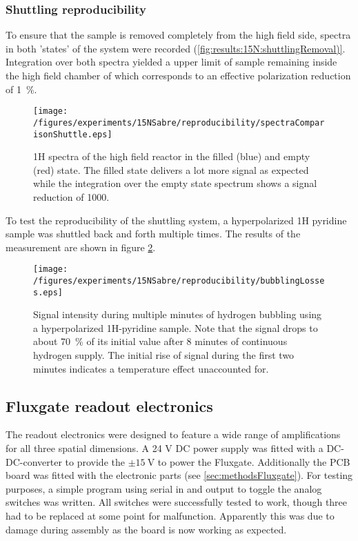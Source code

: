         \subsubsection{Shuttling reproducibility}
        To ensure that the sample is removed completely from the high field side, spectra in both 'states' of the system were recorded (\ref{fig:results:15N:shuttlingRemoval)}. Integration over both spectra yielded a upper limit of sample remaining inside the high field chamber of which corresponds to an effective polarization reduction of \SI{1}{\percent}.
        \begin{figure}
            \label{fig:results:15N:shuttlingRemoval}
            \centering
            \texttt{[image: /figures/experiments/15NSabre/reproducibility/spectraComparisonShuttle.eps]}
            \caption[High field removal efficiency]{1H spectra of the high field reactor in the filled (blue) and empty (red) state. The filled state delivers a lot more signal as expected while the integration over the empty state spectrum shows a signal reduction of 1000.}
        \end{figure}
        To test the reproducibility of the shuttling system, a hyperpolarized 1H pyridine sample was shuttled back and forth multiple times. The results of the measurement are shown in figure \ref{fig:results:15N:shuttlingReproducibility}. 
        \begin{figure}
            \label{fig:results:15N:shuttlingReproducibility}
            \centering
            \texttt{[image: /figures/experiments/15NSabre/reproducibility/bubblingLosses.eps]}
            \caption[Bubbling fluid losses]{Signal intensity during multiple minutes of hydrogen bubbling using a hyperpolarized 1H-pyridine sample. Note that the signal drops to about \SI{70}{\percent} of its initial value after 8 minutes of continuous hydrogen supply. The initial rise of signal during the first two minutes indicates a temperature effect unaccounted for.}
        \end{figure}
    \subsection{Fluxgate readout electronics}
        The readout electronics were designed to feature a wide range of amplifications for all
        three spatial dimensions. A 24 V DC power supply was fitted with a DC-DC-converter to
        provide the $\pm\SI{15}{\volt}$ to power the Fluxgate. Additionally the PCB board was fitted
        with the electronic parts (see \ref{sec:methodsFluxgate}). For testing purposes, a simple program
        using serial in and output to toggle the analog switches was written. All switches were
        successfully tested to work, though three had to be replaced at some point for malfunction.
        Apparently this was due to damage during assembly as the board is now working as expected.
